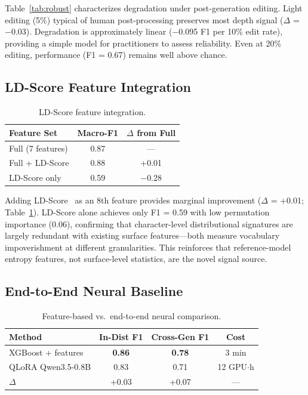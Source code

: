 \documentclass[letterpaper, 10pt]{article}
\begin{document}
Table~\ref{tab:robust} characterizes degradation under post-generation editing.
Light editing (5\%) typical of human post-processing preserves most depth signal ($\Delta$ = $-$0.03).
Degradation is approximately linear ($-$0.095 F1 per 10\% edit rate), providing a simple model for practitioners to assess reliability.
Even at 20\% editing, performance (F1 = 0.67) remains well above chance.

\subsection{LD-Score Feature Integration}

\begin{table}[t]
\centering
\caption{LD-Score feature integration.}
\label{tab:ld}
\small
\begin{tabular}{@{}lcc@{}}
\toprule
Feature Set & Macro-F1 & $\Delta$ from Full \\
\midrule
Full (7 features) & 0.87 & --- \\
Full + LD-Score & 0.88 & +0.01 \\
LD-Score only & 0.59 & $-$0.28 \\
\bottomrule
\end{tabular}
\end{table}

Adding LD-Score~\cite{dugan2024ldscore} as an 8th feature provides marginal improvement ($\Delta$ = +0.01; Table~\ref{tab:ld}).
LD-Score alone achieves only F1 = 0.59 with low permutation importance (0.06), confirming that character-level distributional signatures are largely redundant with existing surface features---both measure vocabulary impoverishment at different granularities.
This reinforces that reference-model entropy features, not surface-level statistics, are the novel signal source.

\subsection{End-to-End Neural Baseline}
\label{sec:e2e}

\begin{table}[t]
\centering
\caption{Feature-based vs.\ end-to-end neural comparison.}
\label{tab:e2e}
\small
\begin{tabular}{@{}lccc@{}}
\toprule
Method & In-Dist F1 & Cross-Gen F1 & Cost \\
\midrule
XGBoost + features & \textbf{0.86} & \textbf{0.78} & 3 min \\
QLoRA Qwen3.5-0.8B & 0.83 & 0.71 & 12 GPU$\cdot$h \\
\midrule
$\Delta$ & +0.03 & +0.07 & --- \\
\bottomrule
\end{tabular}
\end{table}
\end{document}
